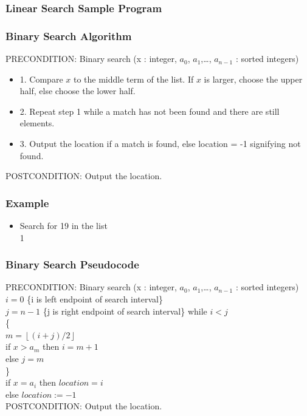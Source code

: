 \documentclass{beamer}
\begin{document}
\begin{frame}
\frametitle{Linear Search Sample Program}
 \end{frame}

\begin{frame}
\frametitle{\huge Binary Search Algorithm}
PRECONDITION: Binary search  (x : integer, $a_0$, $a_1$,\ldots, $a_{n-1}$ : sorted integers) 
\begin{itemize} 
\Large
\item <1-> 1. Compare $x$ to the middle term of the list. If $x$ is larger, choose the upper half, else choose the lower half.
\item <2-> 2. Repeat step 1 while a match has not been found and there are still elements.
\item <3-> 3. Output the location if a match is found, else location = -1 signifying not found.
\end{itemize}
POSTCONDITION: Output the location. 
\end{frame}

\begin{frame}
\frametitle{\huge Example}
\begin{itemize} 
\Large
\item <1->  Search for 19 in the list \\
1               
\end{itemize}
\end{frame}


\begin{frame}
\frametitle{\huge Binary Search Pseudocode}
PRECONDITION: Binary search  (x : integer, $a_0$, $a_1$,\ldots, $a_{n-1}$ : sorted integers) \\ 
\quad $i = 0$ \{i is left endpoint of search interval\} \\
\quad $j = n-1$ \{j is right endpoint of search interval\}
\quad while $i < j$ \\
\quad \{  \\
\qquad $m = \left\lfloor {(i + j)/2} \right\rfloor $ \\
\qquad if $x > a_m$ then $i = m + 1$ \\
\qquad else $j = m$ \\
\quad \}  \\
\quad if $x = a_i$ then $location = i$ \\
else $location := -1$ \\
POSTCONDITION: Output the location. 
\end{frame}
\end{document}
